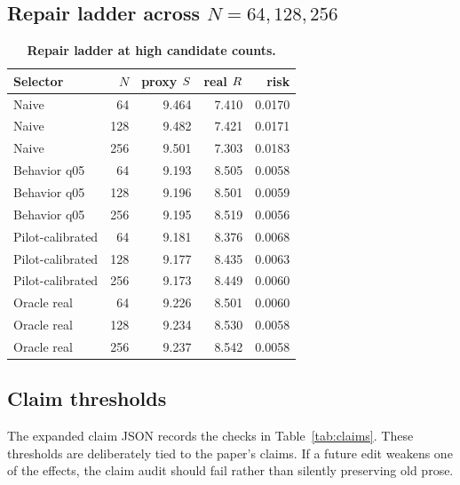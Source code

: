 \subsection{Repair ladder across \texorpdfstring{$N=64,128,256$}{N=64,128,256}}

\begin{table}[t]
\centering
\small
\caption{\textbf{Repair ladder at high candidate counts.}}
\label{tab:repair-alln}
\begin{tabular}{lrrrr}
\toprule
Selector & $N$ & proxy $S$ & real $R$ & risk \\
\midrule
Naive & 64 & 9.464 & 7.410 & 0.0170 \\
Naive & 128 & 9.482 & 7.421 & 0.0171 \\
Naive & 256 & 9.501 & 7.303 & 0.0183 \\
Behavior q05 & 64 & 9.193 & 8.505 & 0.0058 \\
Behavior q05 & 128 & 9.196 & 8.501 & 0.0059 \\
Behavior q05 & 256 & 9.195 & 8.519 & 0.0056 \\
Pilot-calibrated & 64 & 9.181 & 8.376 & 0.0068 \\
Pilot-calibrated & 128 & 9.177 & 8.435 & 0.0063 \\
Pilot-calibrated & 256 & 9.173 & 8.449 & 0.0060 \\
Oracle real & 64 & 9.226 & 8.501 & 0.0060 \\
Oracle real & 128 & 9.234 & 8.530 & 0.0058 \\
Oracle real & 256 & 9.237 & 8.542 & 0.0058 \\
\bottomrule
\end{tabular}
\end{table}

\subsection{Claim thresholds}

The expanded claim JSON records the checks in Table~\ref{tab:claims}. These thresholds are deliberately tied to the paper's claims. If a future edit weakens one of the effects, the claim audit should fail rather than silently preserving old prose.


